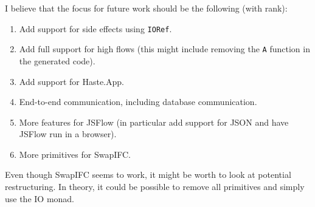 I believe that the focus for future work should be the following (with rank):
\begin{enumerate}
  \item Add support for side effects using {\tt IORef}.
  \item Add full support for high flows (this might include removing the {\tt A} function in the generated code).
  \item Add support for Haste.App.
  \item End-to-end communication, including database communication.
  \item More features for JSFlow (in particular add support for JSON and have JSFlow run in a browser).
  \item More primitives for SwapIFC.
\end{enumerate}
Even though SwapIFC seems to work, it might be worth to look at potential restructuring. In theory, it could be possible to remove all primitives and simply use the IO monad.
